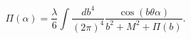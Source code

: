 \begin{equation}
\Pi(\alpha)=\frac{\lambda}{6}\int
\frac{db^{4}}{(2\pi)^{4}}\frac{\cos\left(  b\theta \alpha\right)
}{b^{2}+M^{2}+\Pi(b)}. \label{pie}
\end{equation}

